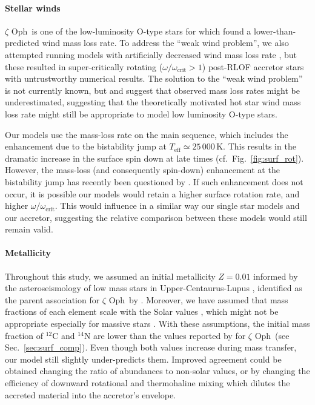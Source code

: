 \documentclass[twocolumn,twocolappendix,trackchanges]{aastex63}
\DeclareRobustCommand{\Figref}[1]{Fig.~\ref{#1}}
\DeclareRobustCommand{\Secref}[1]{Sec.~\ref{#1}}
\newcommand{\zoph}{$\zeta$ Oph}
\begin{document}
\paragraph{Stellar winds}
\zoph\ is one of the low-luminosity O-type stars for which
\cite{marcolino:09} found a lower-than-predicted wind mass loss rate.
To address the ``weak wind problem'', we also attempted running models
with artificially decreased wind mass loss rate
\citep[e.g.,][]{renzo:17}, but these resulted in super-critically
rotating ($\omega/\omega_\mathrm{crit}>1$) post-RLOF accretor stars
with untrustworthy numerical results. The solution to the ``weak wind
problem'' is not currently known, but \cite{lucy:12} and
\cite{lagae:21} suggest that observed mass loss rates might be
underestimated, suggesting that the theoretically motivated hot star
wind mass loss rate might still be appropriate to model low luminosity
O-type stars.

Our models use the \cite{vink:00, vink:01} mass-loss rate on the main
sequence, which includes the enhancement due to the bistability jump
at $T_\mathrm{eff}\simeq25\,000\,\mathrm{K}$. This results in the
dramatic increase in the surface spin down at late times (cf.\
\Figref{fig:surf_rot}). However, the mass-loss (and consequently
spin-down) enhancement at the bistability jump has recently been
questioned by \cite{bjorklund:21}. If such enhancement does not occur,
it is possible our models would retain a higher surface rotation rate,
and higher $\omega/\omega_\mathrm{crit}$. This would influence in a
similar way our single star models and our accretor, suggesting the
relative comparison between these models would still remain valid.

\paragraph{Metallicity}
Throughout this study, we assumed an initial metallicity $Z=0.01$
informed by the asteroseismology of low mass stars in
Upper-Centaurus-Lupus \citep[e.g.,][]{murphy:21}, identified as the
parent association for \zoph\ by \cite{neuhauser:20}. Moreover, we
have assumed that mass fractions of each element scale with the Solar
values \citep{grevesse:98}, which might not be appropriate especially
for massive stars \citep[e.g.,][]{grasha:21}. With these assumptions,
the initial mass fraction of $^{12}\mathrm{C}$ and $^{14}\mathrm{N}$
are lower than the values reported by \citetalias{villamariz:05} for
\zoph\ (see \Secref{sec:surf_comp}). Even though both values increase during mass transfer, our
model still slightly under-predicts them. Improved agreement could be
obtained changing the ratio of abundances to non-solar values, or by
changing the efficiency of downward rotational and thermohaline mixing
which dilutes the accreted material into the accretor's envelope.
\end{document}
